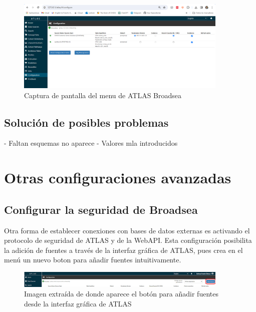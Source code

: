 \begin{enumerate}
\begin{figure}[H]
    \centering
    \includegraphics[width=0.90\textwidth]{figures/showConfiguration.png}
    \caption{Captura de pantalla del menu  de ATLAS Broadsea}
    \label{fig:showConfiguration}
\end{figure}
\end{enumerate}

\subsection{Solución de posibles problemas}

- Faltan esquemas no aparece
- Valores mla introducidos

\section{Otras configuraciones avanzadas} \label{cap:04.2ConfigAvanzada}

\subsection{Configurar la seguridad de Broadsea} \label{cap:04.2.1Seguridad}

Otra forma de establecer conexiones con bases de datos externas es activando el protocolo de seguridad de ATLAS y de la WebAPI. Esta configuración posibilita la adición de fuentes a través de la interfaz gráfica de ATLAS, pues crea en el menú  un nuevo boton para añadir fuentes intuitivamente. 

\begin{figure}[H]
    \centering
    \includegraphics[width=0.90\textwidth]{figures/capNewSource.png}
    \caption{Imagen extraída de \cite{forumAddMSDB} donde aparece el botón para añadir fuentes desde la interfaz gráfica de ATLAS}
    \label{fig:capNewSource}
\end{figure}


